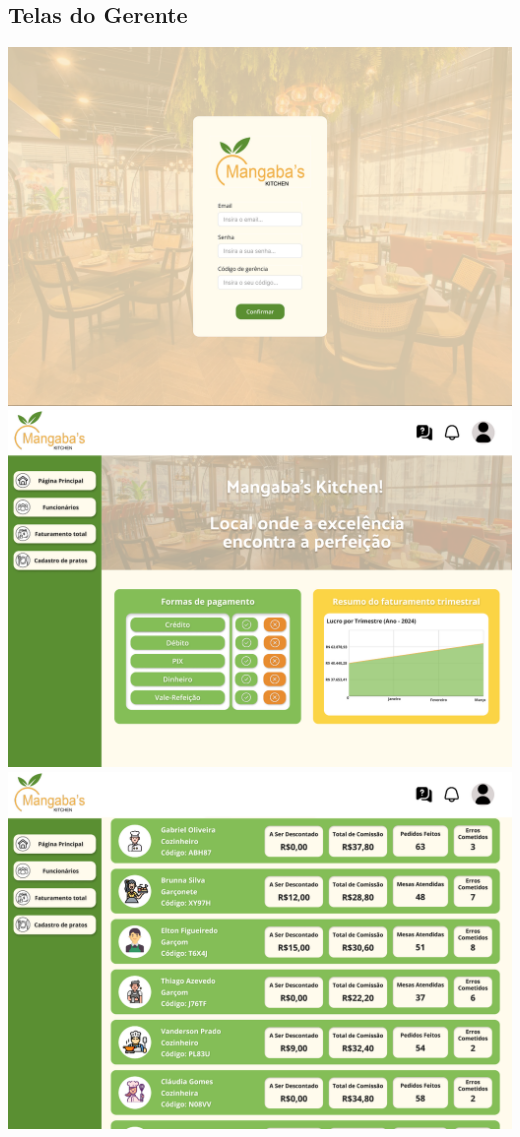 \subsection{Telas do Gerente}
\begin{center}
    \includegraphics[width=1\textwidth]{imagens-template/Layout_Gerente_2638.png} 
    \includegraphics[width=1\textwidth]{imagens-template/Layout_Gerente_2700.png} 
    \includegraphics[width=1\textwidth]{imagens-template/Layout_Gerente_2659.png} 

\end{center}
